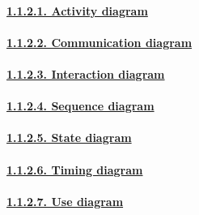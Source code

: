 \documentclass[
]{article}
\begin{document}
\hypertarget{activity-diagram}{%
\paragraph{\texorpdfstring{\protect\hyperlink{activity-diagram-1}{1.1.2.1.
Activity diagram}}{1.1.2.1. Activity diagram}}\label{activity-diagram}}

\hypertarget{communication-diagram}{%
\paragraph{\texorpdfstring{\protect\hyperlink{communication-diagram-1}{1.1.2.2.
Communication
diagram}}{1.1.2.2. Communication diagram}}\label{communication-diagram}}

\hypertarget{interaction-diagram}{%
\paragraph{\texorpdfstring{\protect\hyperlink{interaction-diagram-1}{1.1.2.3.
Interaction
diagram}}{1.1.2.3. Interaction diagram}}\label{interaction-diagram}}

\hypertarget{sequence-diagram}{%
\paragraph{\texorpdfstring{\protect\hyperlink{sequence-diagram-1}{1.1.2.4.
Sequence diagram}}{1.1.2.4. Sequence diagram}}\label{sequence-diagram}}

\hypertarget{state-diagram}{%
\paragraph{\texorpdfstring{\protect\hyperlink{state-diagram-1}{1.1.2.5.
State diagram}}{1.1.2.5. State diagram}}\label{state-diagram}}

\hypertarget{timing-diagram}{%
\paragraph{\texorpdfstring{\protect\hyperlink{timing-diagram-1}{1.1.2.6.
Timing diagram}}{1.1.2.6. Timing diagram}}\label{timing-diagram}}

\hypertarget{use-diagram}{%
\paragraph{\texorpdfstring{\protect\hyperlink{use-diagram-1}{1.1.2.7.
Use diagram}}{1.1.2.7. Use diagram}}\label{use-diagram}}
\end{document}
